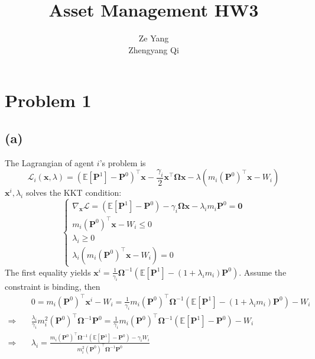 \documentclass[10pt]{article}
\title{Asset Management HW3}
\author{Ze Yang \\ Zhengyang Qi}
\begin{document}
    
    
    \maketitle
    

    \section{Problem 1}
\subsection{(a)} 
The Lagrangian of agent $i$'s problem is
\begin{equation}
  \mathcal{L}_i(\bm{x}, \lambda) = (\mathbb{E}\left[\bm{P}^1\right] - \bm{P}^0)^{\top} \bm{x} - \frac{\gamma_i}{2} \bm{x}^{\top} \bm{\Omega}\bm{x} - \lambda(m_i (\bm{P}^0)^{\top} \bm{x} - W_i)
\end{equation}
$\bm{x}^i, \lambda_i$ solves the KKT condition:
\begin{equation}
  \begin{cases}
    \nabla_{\bm{x}} \mathcal{L} = (\mathbb{E}\left[\bm{P}^1\right] - \bm{P}^0) - \gamma_i \bm{\Omega x} - \lambda_i m_i \bm{P}^0 = \bm{0} \\
    m_i (\bm{P}^0)^{\top} \bm{x} - W_i \leq 0 \\
    \lambda_i \geq 0 \\
    \lambda_i (m_i (\bm{P}^0)^{\top} \bm{x} - W_i) = 0
  \end{cases}
\end{equation}
The first equality yields $\bm{x}^i = \frac{1}{\gamma_i}\bm{\Omega}^{-1}\left(\mathbb{E}\left[\bm{P}^1\right] - (1+\lambda_i m_i)\bm{P}^0\right)$. Assume the constraint is binding, then
\begin{equation}
  \begin{split}
    &0 = m_i (\bm{P}^0)^{\top} \bm{x}^i - W_i = \frac{1}{\gamma_i}m_i (\bm{P}^0)^{\top}\bm{\Omega}^{-1}\left(\mathbb{E}\left[\bm{P}^1\right] - (1+\lambda_i m_i)\bm{P}^0\right) - W_i \\
    \Rightarrow \quad &  \frac{\lambda_i}{\gamma_i}m_i^2 (\bm{P}^0)^{\top}\bm{\Omega}^{-1} \bm{P}^0 =  \frac{1}{\gamma_i}m_i (\bm{P}^0)^{\top}\bm{\Omega}^{-1}\left(\mathbb{E}\left[\bm{P}^1\right] - \bm{P}^0\right) - W_i \\
    \Rightarrow \quad & \lambda_i = \frac{m_i (\bm{P}^0)^{\top}\bm{\Omega}^{-1}\left(\mathbb{E}\left[\bm{P}^1\right] - \bm{P}^0\right) - \gamma_i W_i}{m_i^2 (\bm{P}^0)^{\top}\bm{\Omega}^{-1} \bm{P}^0}
  \end{split}
\end{equation}
\end{document}
